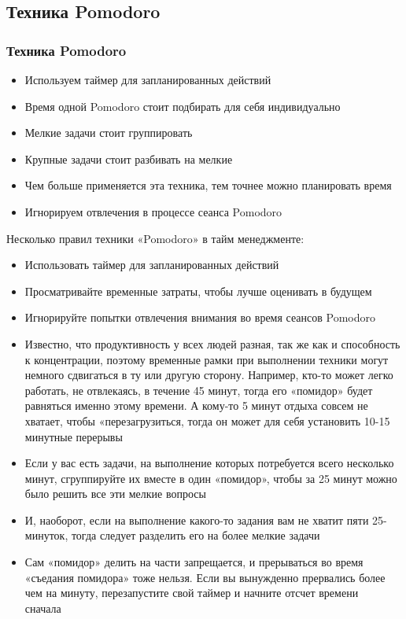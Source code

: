 \documentclass{../industrial-development}
\begin{document}
\subsection{Техника Pomodoro}

\begin{frame} \frametitle{Техника Pomodoro}
  \begin{itemize}
  \item Используем таймер для запланированных действий
  \item Время одной Pomodoro стоит подбирать для себя индивидуально
  \item Мелкие задачи стоит группировать
  \item Крупные задачи стоит разбивать на мелкие
  \item Чем больше применяется эта техника, тем точнее можно планировать время
  \item Игнорируем отвлечения в процессе сеанса Pomodoro
  \end{itemize}
\end{frame}

\lecturenotes

Несколько правил техники «Pomodoro» в тайм менеджменте:
\begin{itemize}
\item Использовать таймер для запланированных действий
\item Просматривайте временные затраты, чтобы лучше оценивать в будущем
\item Игнорируйте попытки отвлечения внимания во время сеансов Pomodoro~\cite{TMSeimer}
\item Известно, что продуктивность у всех людей разная, так же как и способность к концентрации, поэтому временные рамки при выполнении техники могут немного сдвигаться в ту или другую сторону. Например, кто-то может легко работать, не отвлекаясь, в течение 45 минут, тогда его «помидор» будет равняться именно этому времени. А кому-то 5 минут отдыха совсем не хватает, чтобы «перезагрузиться, тогда он может для себя установить 10-15 минутные перерывы
\item Если у вас есть задачи, на выполнение которых потребуется всего несколько минут, сгруппируйте их вместе в один «помидор», чтобы за 25 минут можно было решить все эти мелкие вопросы
\item И, наоборот, если на выполнение какого-то задания вам не хватит пяти 25-минуток, тогда следует разделить его на более мелкие задачи
\item Сам «помидор» делить на части запрещается, и прерываться во время «съедания помидора» тоже нельзя. Если вы вынужденно прервались более чем на минуту, перезапустите свой таймер и начните отсчет времени сначала~\cite{Pomidoro}
\end{itemize}
\end{document}
